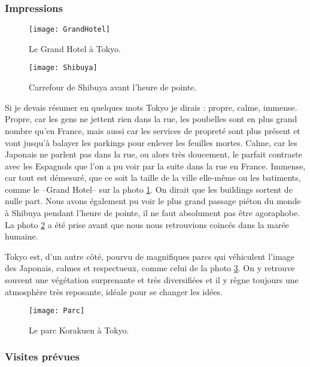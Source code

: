 \documentclass[11pt,journal]{RapportFR}
\begin{document}
\begin{CJK*}{UTF8}{min}
\subsubsection{Impressions}

\begin{figure}[!t]
\centering
\texttt{[image: GrandHotel]}
\caption{Le Grand Hotel \`a Tokyo.}
\label{fig_hotel}
\end{figure}

\begin{figure}[!t]
\centering
\texttt{[image: Shibuya]}
\caption{Carrefour de Shibuya avant l'heure de pointe.}
\label{fig_shibuya}
\end{figure}

Si je devais r\'esumer en quelques mots Tokyo je dirais : propre, calme, immense.
Propre, car les gens ne jettent rien dans la rue, les poubelles sont en plus grand nombre qu'en France, mais aussi car les services de propret\'e sont plus pr\'esent et vont jusqu'\`a balayer les parkings pour enlever les feuilles mortes.
Calme, car les Japonais ne parlent pas dans la rue, ou alors tr\`es doucement, le parfait contraste avec les Espagnols que l'on a pu voir par la suite dans la rue en France.
Immense, car tout est d\'emesur\'e, que ce soit la taille de la ville elle-m\^eme ou les batiments, comme le --Grand Hotel-- sur la photo \ref{fig_hotel}. On dirait que les buildings sortent de nulle part. Nous avons \'egalement pu voir le plus grand passage pi\'eton du monde \`a Shibuya pendant l'heure de pointe, il ne faut absolument pas \^etre agoraphobe. La photo \ref{fig_shibuya} a \'et\'e prise avant que nous nous retrouvions coinc\'es dans la mar\'ee humaine.

Tokyo est, d'un autre c\^ot\'e, pourvu de magnifiques parcs qui v\'ehiculent l'image des Japonais, calmes et respectueux, comme celui de la photo \ref{fig_parc}. On y retrouve souvent une v\'eg\'etation surprenante et tr\`es diversifi\'ees et il y r\`egne toujours une atmosph\`ere tr\`es reposante, id\'eale pour se changer les id\'ees.

\begin{figure}[!t]
\centering
\texttt{[image: Parc]}
\caption{Le parc Korakuen \`a Tokyo.}
\label{fig_parc}
\end{figure}

\subsubsection{Visites pr\'evues}


\end{CJK*}
\end{document}
